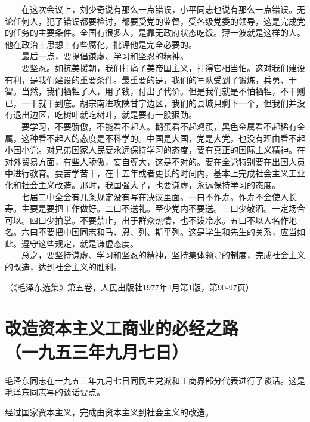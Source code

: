 \documentclass[cn,11pt,chinese]{elegantbook}
\def\myformat#1{\hfil\hfil #1}
\begin{document}
　　在这次会议上，刘少奇说有那么一点错误，小平同志也说有那么一点错误。无论任何人，犯了错误都要检讨，都要受党的监督，受各级党委的领导，这是完成党的任务的主要条件。全国有很多人，是靠无政府状态吃饭。薄一波就是这样的人。他在政治上思想上有些腐化，批评他是完全必要的。\\
　　最后一点，要提倡谦虚、学习和坚忍的精神。\\
　　要坚忍。如抗美援朝，我们打痛了美帝国主义，打得它相当怕。这对我们建设有利，是我们建设的重要条件。最重要的是，我们的军队受到了锻炼，兵勇、干智。当然，我们牺牲了人，用了钱，付出了代价。但是我们就是不怕牺牲，不干则已，一干就干到底。胡宗南进攻陕甘宁边区，我们的县城只剩下一个，但我们并没有退出边区，吃树叶就吃树叶，就是要有一股狠劲。\\
　　要学习，不要骄傲，不能看不起人。鹅蛋看不起鸡蛋，黑色金属看不起稀有金属，这种看不起人的态度是不科学的。中国是大国，党是大党，也没有理由看不起小国小党。对兄弟国家人民要永远保持学习的态度，要有真正的国际主义精神。在对外贸易方面，有些人骄傲，妄自尊大，这是不对的。要在全党特别要在出国人员中进行教育。要苦学苦干，在十五年或者更长的时间内，基本上完成社会主义工业化和社会主义改造。那时，我国强大了，也要谦虚，永远保持学习的态度。\\
　　七届二中全会有几条规定没有写在决议里面。一曰不作寿。作寿不会使人长寿。主要是要把工作做好。二曰不送礼。至少党内不要送。三曰少敬酒。一定场合可以。四曰少拍掌。不要禁止，出于群众热情，也不泼冷水。五曰不以人名作地名。六曰不要把中国同志和马、恩、列、斯平列。这是学生和先生的关系，应当如此。遵守这些规定，就是谦虚态度。\\
　　总之，要坚持谦虚、学习和坚忍的精神，坚持集体领导的制度，完成社会主义的改造，达到社会主义的胜利。\\
\begin{flushright}（《毛泽东选集》第五卷，人民出版社1977年4月第1版，第90-97页）\end{flushright}
\newpage\section*{\myformat{改造资本主义工商业的必经之路}\\\myformat{（一九五三年九月七日）}}
\begin{introduction}\item  毛泽东同志在一九五三年九月七日同民主党派和工商界部分代表进行了谈话。这是毛泽东同志写的谈话要点。\end{introduction}
经过国家资本主义，完成由资本主义到社会主义的改造。\\
\end{document}
